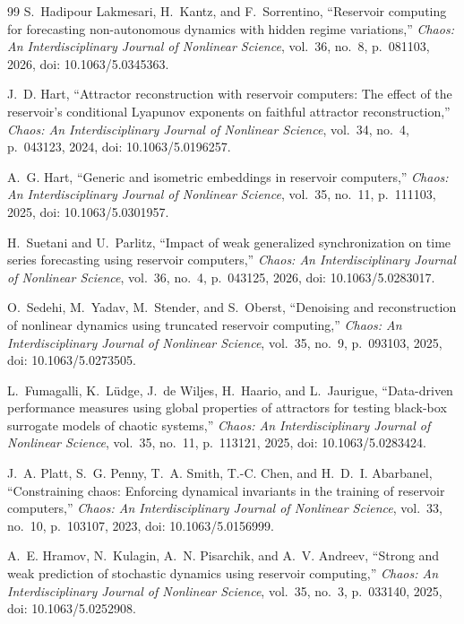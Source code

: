 \documentclass[aip,cha,reprint,amsmath,amssymb]{revtex4-2}
\begin{document}
\begin{thebibliography}{99}
S.~Hadipour Lakmesari, H.~Kantz, and F.~Sorrentino, ``Reservoir computing for forecasting non-autonomous dynamics with hidden regime variations,'' \emph{Chaos: An Interdisciplinary Journal of Nonlinear Science}, vol.~36, no.~8, p.~081103, 2026, doi: 10.1063/5.0345363.

J.~D. Hart, ``Attractor reconstruction with reservoir computers: The effect of the reservoir's conditional Lyapunov exponents on faithful attractor reconstruction,'' \emph{Chaos: An Interdisciplinary Journal of Nonlinear Science}, vol.~34, no.~4, p.~043123, 2024, doi: 10.1063/5.0196257.

A.~G. Hart, ``Generic and isometric embeddings in reservoir computers,'' \emph{Chaos: An Interdisciplinary Journal of Nonlinear Science}, vol.~35, no.~11, p.~111103, 2025, doi: 10.1063/5.0301957.

H.~Suetani and U.~Parlitz, ``Impact of weak generalized synchronization on time series forecasting using reservoir computers,'' \emph{Chaos: An Interdisciplinary Journal of Nonlinear Science}, vol.~36, no.~4, p.~043125, 2026, doi: 10.1063/5.0283017.

O.~Sedehi, M.~Yadav, M.~Stender, and S.~Oberst, ``Denoising and reconstruction of nonlinear dynamics using truncated reservoir computing,'' \emph{Chaos: An Interdisciplinary Journal of Nonlinear Science}, vol.~35, no.~9, p.~093103, 2025, doi: 10.1063/5.0273505.

L.~Fumagalli, K.~L{\"u}dge, J.~de Wiljes, H.~Haario, and L.~Jaurigue, ``Data-driven performance measures using global properties of attractors for testing black-box surrogate models of chaotic systems,'' \emph{Chaos: An Interdisciplinary Journal of Nonlinear Science}, vol.~35, no.~11, p.~113121, 2025, doi: 10.1063/5.0283424.

J.~A. Platt, S.~G. Penny, T.~A. Smith, T.-C. Chen, and H.~D.~I. Abarbanel, ``Constraining chaos: Enforcing dynamical invariants in the training of reservoir computers,'' \emph{Chaos: An Interdisciplinary Journal of Nonlinear Science}, vol.~33, no.~10, p.~103107, 2023, doi: 10.1063/5.0156999.

A.~E. Hramov, N.~Kulagin, A.~N. Pisarchik, and A.~V. Andreev, ``Strong and weak prediction of stochastic dynamics using reservoir computing,'' \emph{Chaos: An Interdisciplinary Journal of Nonlinear Science}, vol.~35, no.~3, p.~033140, 2025, doi: 10.1063/5.0252908.


\end{thebibliography}
\end{document}
